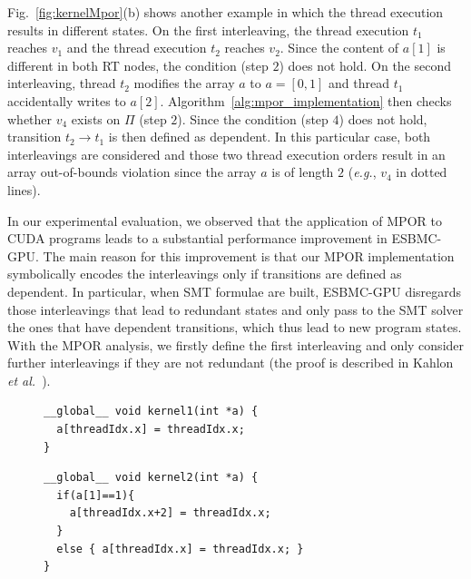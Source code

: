 \documentclass[times, doublespace]{cpeauth}
\begin{document}
Fig.~\ref{fig:kernelMpor}(b) shows another example in which the thread execution results in different states. On the first interleaving, the thread execution $t_1$ reaches $v_1$ and the thread execution $t_2$ reaches $v_2$. Since the content of $a[1]$ is different in both RT nodes, the condition (step $2$) does not hold. On the second interleaving, thread $t_2$ modifies the array $a$ to $a=[0,1]$ and thread $t_1$ accidentally writes to $a[2]$. Algorithm~\ref{alg:mpor_implementation} then checks whether $v_4$ exists on $\Pi$ (step $2$). Since the condition (step $4$) does not hold, transition $t_2 \rightarrow t_1$ is then defined as dependent. In this particular case, both interleavings are considered and those two thread execution orders result in an array out-of-bounds violation since the array $a$ is of length $2$ (\textit{e.g.}, $v_4$ in dotted lines).

In our experimental evaluation, we observed that the application of MPOR to CUDA programs leads to a substantial performance improvement in ESBMC-GPU. The main reason for this improvement is that our MPOR implementation symbolically encodes the interleavings only if transitions are defined as dependent. In particular, when SMT formulae are built, ESBMC-GPU disregards those interleavings that lead to redundant states and only pass to the SMT solver the ones that have dependent transitions, which thus lead to new program states. With the MPOR analysis, we firstly define the first interleaving and only consider further interleavings if they are not redundant (the proof is described in Kahlon {\it et al.}~\cite{KahlonWG09}).

\begin{figure}[h]
\lstset{basicstyle=\scriptsize}
\center

\begin{minipage}{.42\textwidth}
  \begin{lstlisting}
__global__ void kernel1(int *a) {
  a[threadIdx.x] = threadIdx.x;
}
  \end{lstlisting}
\end{minipage}
  \hspace{.7cm}

\begin{minipage}{.51\textwidth}
  \begin{lstlisting}
__global__ void kernel2(int *a) {
  if(a[1]==1){ 
    a[threadIdx.x+2] = threadIdx.x; 
  }
  else { a[threadIdx.x] = threadIdx.x; }
}
  \end{lstlisting}
\end{minipage}
\end{figure}
\end{document}

